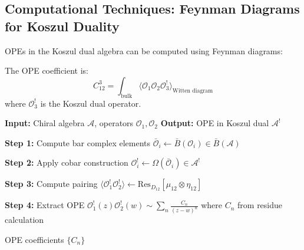 \subsection{Computational Techniques: Feynman Diagrams for Koszul Duality}

\begin{technique}\label{tech:diagrams}
OPEs in the Koszul dual algebra can be computed using Feynman diagrams:

\begin{center}
\end{center}

The OPE coefficient is:
$$C_{12}^3 = \int_{\text{bulk}} \langle \mathcal{O}_1 \mathcal{O}_2 \mathcal{O}_3^! \rangle_{\text{Witten diagram}}$$
where $\mathcal{O}_3^!$ is the Koszul dual operator.
\end{technique}

\begin{algorithm}\label{alg:koszul-ope}
\begin{algorithmic}
\STATE \textbf{Input:} Chiral algebra $\mathcal{A}$, operators $\mathcal{O}_1, \mathcal{O}_2$
\STATE \textbf{Output:} OPE in Koszul dual $\mathcal{A}^!$

\STATE \textbf{Step 1:} Compute bar complex elements
\STATE $\bar{\mathcal{O}}_i \gets \bar{B}(\mathcal{O}_i) \in \bar{B}(\mathcal{A})$

\STATE \textbf{Step 2:} Apply cobar construction
\STATE $\mathcal{O}_i^! \gets \Omega(\bar{\mathcal{O}}_i) \in \mathcal{A}^!$

\STATE \textbf{Step 3:} Compute pairing
\STATE $\langle \mathcal{O}_1^! \mathcal{O}_2^! \rangle \gets \text{Res}_{D_{12}}[\mu_{12} \otimes \eta_{12}]$

\STATE \textbf{Step 4:} Extract OPE
\STATE $\mathcal{O}_1^!(z) \mathcal{O}_2^!(w) \sim \sum_n \frac{C_n}{(z-w)^n}$
\STATE where $C_n$ from residue calculation

\RETURN OPE coefficients $\{C_n\}$
\end{algorithmic}
\end{algorithm}

